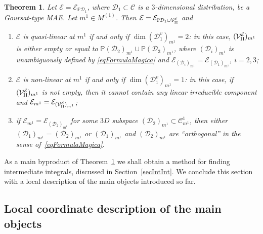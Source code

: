 \documentclass[pdftex]{sigma}
\newcommand{\C}{\mathcal{C}}
\newcommand{\D}{\mathcal{D}}
\newcommand{\MMM}{\mathcal{V}_{\textrm{\normalfont II}}}
\newcommand{\E}{\mathcal{E}}
\renewcommand{\P}{\mathbb{P}}
\newcommand{\Rd}{^\textrm{rd}}
\numberwithin{equation}{section}
\newtheorem{Theorem}{Theorem}[section]
\begin{document}
\begin{Theorem}%
\label{thFormMag}
 Let $\E=\E_{\P\D_1}$, where $\D_1\subset\C$ is a $3$-dimensional distribution, be a Goursat-type MAE. Let $m^1\in M^{(1)}$. Then $\E=\E_{\P\D_1\cup\MMM^\E}$ and
\begin{enumerate}\itemsep=0pt
 \item[$1)$] $\E$ is quasi-linear at $m^1$ if and only if $\dim(\D_1^v)_{m^1}=2$: in this case, $(\MMM^\E)_{m^1}$ is either empty or equal to $\P({\D_2})_{m^1}\cup\P({\D_3})_{m^1}$, where $({\D_i})_{m^1}$ is unambiguously defined by \eqref{eqFormulaMagica} and $\E_{(\D_i)_{m^1}}=\E_{(\D_1)_{m^1}}$, $i=2,3$;
\item[$2)$] $\E$ is non-linear at $m^1$ if and only if $\dim(\D_1^v)_{m^1}=1$: in this case, if $(\MMM^\E)_{m^1}$ is not empty, then it cannot contain any linear irreducible component and $\E_{m^1}=\E_{(\MMM^\E)_{m^1}}$;
\item[$3)$] if $\E_{m^1}=\E_{(\D_2)_{m^1}}$ for some $3D$ subspace $(\D_2)_{m^1}\subset\C^1_{m^1}$, then either $(\D_1)_{m^1}=(\D_2)_{m^1}$ or $(\D_1)_{m^1}$ and $(\D_2)_{m^1}$ are ``orthogonal'' in the sense of~\eqref{eqFormulaMagica}.
\end{enumerate}
\end{Theorem}

As a main byproduct of Theorem~\ref{thFormMag} we shall obtain a method for f\/inding intermediate integrals, discussed in Section~\ref{secIntInt}.
We conclude this section with a local description of the main objects introduced so far.

\subsection{Local coordinate description of the main objects}
\end{document}
